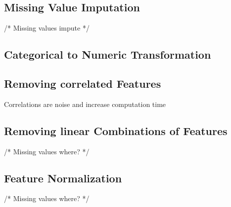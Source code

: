 \subsection{Missing Value Imputation} /* Missing values impute */
\subsection{Categorical to Numeric Transformation }
\subsection{Removing correlated Features } 
Correlations are noise and increase computation time
\subsection{Removing linear Combinations of Features} /* Missing values where? */
\subsection{Feature Normalization} /* Missing values where? */


